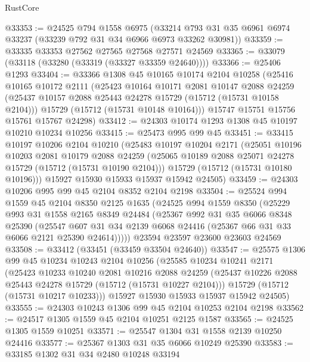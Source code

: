 \begin{lexlean}{RustCore}
\begin{coremodule}
@33353 := @24525
    @794
    @1558
    @6975
    (@33214 @793 @31 @35 @6961 @6974 @33237 (@33239 @792 @31 @34 @6966 @6973 @33262 @30981))
@33359 := @33335 @33353 @27562 @27565 @27568 @27571 @24569
@33365 := @33079 (@33118 (@33280 (@33319 (@33327 @33359 @24640))))
@33366 := @25406 @1293
@33404 := @33366
    @1308
    @45
    @10165
    @10174
    @2104
    @10258
    (@25416
      @10165
      @10172
      @2111
      (@25423
        @10164
        @10171
        @2081
        @10147
        @2088
        @24259
        (@25437 @10157 @2088 @25443 @24278 @15729 (@15712 (@15731 @10158 @2104)))
        @15729
        (@15712 (@15731 @10148 @10164)))
      @15747
      @15751
      @15756
      @15761
      @15767
      @24298)
@33412 := @24303 @10174 @1293 @1308 @45 @10197 @10210 @10234 @10256
@33415 := @25473 @995 @99 @45
@33451 := @33415
    @10197
    @10206
    @2104
    @10210
    (@25483
      @10197
      @10204
      @2171
      (@25051
        @10196
        @10203
        @2081
        @10179
        @2088
        @24259
        (@25065 @10189 @2088 @25071 @24278 @15729 (@15712 (@15731 @10190 @2104)))
        @15729
        (@15712 (@15731 @10180 @10196)))
      @15927
      @15930
      @15933
      @15937
      @15942
      @24505)
@33459 := @24303 @10206 @995 @99 @45 @2104 @8352 @2104 @2198
@33504 := @25524
    @994
    @1559
    @45
    @2104
    @8350
    @2125
    @1635
    (@24525
      @994
      @1559
      @8350
      (@25229
        @993
        @31
        @1558
        @2165
        @8349
        @24484
        (@25367
          @992
          @31
          @35
          @6066
          @8348
          @25390
          (@25547 @607 @31 @34 @2139 @6068 @24416 (@25367 @66 @31 @33 @6066 @2121 @25390 @24614)))))
    @23594
    @23597
    @23600
    @23603
    @24569
@33508 := @33412 (@33451 (@33459 @33504 @24640))
@33547 := @25575
    @1306
    @99
    @45
    @10234
    @10243
    @2104
    @10256
    (@25585
      @10234
      @10241
      @2171
      (@25423
        @10233
        @10240
        @2081
        @10216
        @2088
        @24259
        (@25437 @10226 @2088 @25443 @24278 @15729 (@15712 (@15731 @10227 @2104)))
        @15729
        (@15712 (@15731 @10217 @10233)))
      @15927
      @15930
      @15933
      @15937
      @15942
      @24505)
@33555 := @24303 @10243 @1306 @99 @45 @2104 @10253 @2104 @2198
@33562 := @24517 @1305 @1559 @45 @2104 @10251 @2125 @1587
@33565 := @24525 @1305 @1559 @10251
@33571 := @25547 @1304 @31 @1558 @2139 @10250 @24416
@33577 := @25367 @1303 @31 @35 @6066 @10249 @25390
@33583 := @33185 @1302 @31 @34 @2480 @10248 @33194

\end{coremodule}
\end{lexlean}
